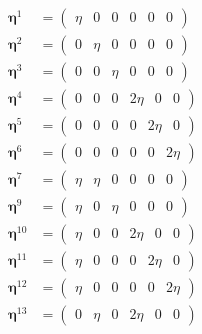 \documentclass[showpacs,floatfix,aps,prb,preprint,superscriptaddress]{revtex4-1}
\begin{document}
 \begin{widetext}
\begin{subequations}
\label{eqn:strainstates} 
\begin{align}
        \bm{\eta}^1 &=\left(\begin{matrix} \eta & 0 & 0 & 0 & 0 & 0 \end{matrix}\right)\\
		\bm{\eta}^2 &=\left(\begin{matrix} 0 & \eta & 0 & 0 & 0 & 0 \end{matrix}\right)\\
		\bm{\eta}^3 &=\left(\begin{matrix} 0 & 0 & \eta & 0 & 0 & 0 \end{matrix}\right)\\
    	\bm{\eta}^4 &=\left(\begin{matrix} 0 & 0 & 0 & 2\eta & 0 & 0 \end{matrix}\right)\\
    	\bm{\eta}^5 &=\left(\begin{matrix} 0 & 0 & 0 & 0 & 2\eta & 0 \end{matrix}\right)\\
    	\bm{\eta}^6 &=\left(\begin{matrix} 0 & 0 & 0 & 0 & 0 & 2\eta \end{matrix}\right)\\
    	\bm{\eta}^7 &=\left(\begin{matrix} \eta & \eta & 0 & 0 & 0 & 0 \end{matrix}\right)\\
    	\bm{\eta}^9 &=\left(\begin{matrix} \eta & 0 & \eta & 0 & 0 & 0 \end{matrix}\right)\\
    	\bm{\eta}^{10} &=\left(\begin{matrix} \eta & 0 & 0 & 2\eta & 0 & 0 \end{matrix}\right)\\
    	\bm{\eta}^{11} &=\left(\begin{matrix} \eta & 0 & 0 & 0 & 2\eta & 0 \end{matrix}\right)\\
    	\bm{\eta}^{12} &=\left(\begin{matrix} \eta & 0 & 0 & 0 & 0 & 2\eta \end{matrix}\right)\\
    	\bm{\eta}^{13} &=\left(\begin{matrix} 0 & \eta & 0 & 2\eta & 0 & 0 \end{matrix}\right)\\

\end{align}
\end{subequations}
\end{widetext}
\end{document}

